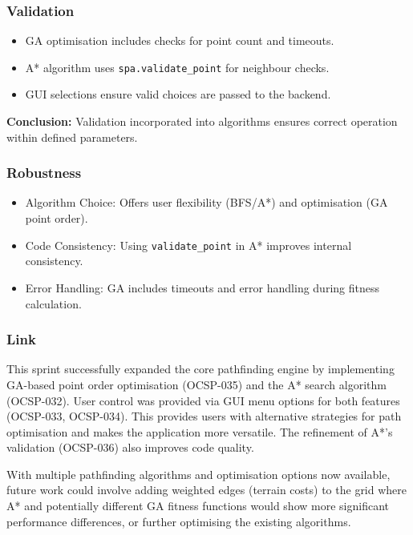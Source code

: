 \subsubsection{Validation}
\begin{itemize}
	\item GA optimisation includes checks for point count and timeouts.
	\item A* algorithm uses \verb|spa.validate_point| for neighbour checks.
	\item GUI selections ensure valid choices are passed to the backend.
\end{itemize}
\textbf{Conclusion:} Validation incorporated into algorithms ensures correct operation within defined parameters.

\subsubsection{Robustness}
\begin{itemize}
	\item Algorithm Choice: Offers user flexibility (BFS/A*) and optimisation (GA point order).
	\item Code Consistency: Using \verb|validate_point| in A* improves internal consistency.
	\item Error Handling: GA includes timeouts and error handling during fitness calculation.
\end{itemize}

\subsubsection{Link}
This sprint successfully expanded the core pathfinding engine by implementing GA-based point order optimisation (OCSP-035) and the A* search algorithm (OCSP-032). User control was provided via GUI menu options for both features (OCSP-033, OCSP-034). This provides users with alternative strategies for path optimisation and makes the application more versatile. The refinement of A*'s validation (OCSP-036) also improves code quality.

With multiple pathfinding algorithms and optimisation options now available, future work could involve adding weighted edges (terrain costs) to the grid where A* and potentially different GA fitness functions would show more significant performance differences, or further optimising the existing algorithms.


